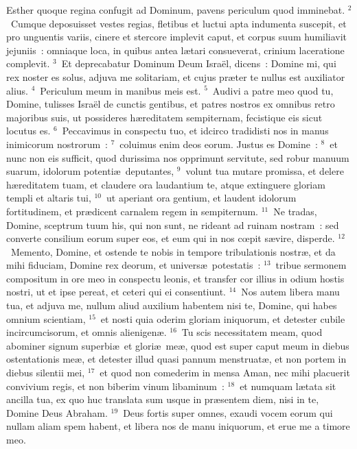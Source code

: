 \lettrine[lines=3,image=true,loversize=0.05,lraise=-0.03]{E}{}sther quoque regina confugit ad Dominum, pavens periculum quod imminebat.
${}^{2}$~Cumque deposuisset vestes regias, fletibus et luctui apta indumenta suscepit, et pro unguentis variis, cinere et stercore implevit caput, et corpus suum humiliavit jejuniis~: omniaque loca, in quibus antea l\ae tari consueverat, crinium laceratione complevit.
${}^{3}$~Et deprecabatur Dominum Deum Isra\"el, dicens~: Domine mi, qui rex noster es solus, adjuva me solitariam, et cujus pr\ae ter te nullus est auxiliator alius.
${}^{4}$~Periculum meum in manibus meis est.
${}^{5}$~Audivi a patre meo quod tu, Domine, tulisses Isra\"el de cunctis gentibus, et patres nostros ex omnibus retro majoribus suis, ut possideres h\ae reditatem sempiternam, fecistique eis sicut locutus es.
${}^{6}$~Peccavimus in conspectu tuo, et idcirco tradidisti nos in manus inimicorum nostrorum~:
${}^{7}$~coluimus enim deos eorum. Justus es Domine~:
${}^{8}$~et nunc non eis sufficit, quod durissima nos opprimunt servitute, sed robur manuum suarum, idolorum potenti\ae\ deputantes,
${}^{9}$~volunt tua mutare promissa, et delere h\ae reditatem tuam, et claudere ora laudantium te, atque extinguere gloriam templi et altaris tui,
${}^{10}$~ut aperiant ora gentium, et laudent idolorum fortitudinem, et pr\ae dicent carnalem regem in sempiternum.
${}^{11}$~Ne tradas, Domine, sceptrum tuum his, qui non sunt, ne rideant ad ruinam nostram~: sed converte consilium eorum super eos, et eum qui in nos cœpit s\ae vire, disperde.
${}^{12}$~Memento, Domine, et ostende te nobis in tempore tribulationis nostr\ae , et da mihi fiduciam, Domine rex deorum, et univers\ae\ potestatis~:
${}^{13}$~tribue sermonem compositum in ore meo in conspectu leonis, et transfer cor illius in odium hostis nostri, ut et ipse pereat, et ceteri qui ei consentiunt.
${}^{14}$~Nos autem libera manu tua, et adjuva me, nullum aliud auxilium habentem nisi te, Domine, qui habes omnium scientiam,
${}^{15}$~et nosti quia oderim gloriam iniquorum, et detester cubile incircumcisorum, et omnis alienigen\ae .
${}^{16}$~Tu scis necessitatem meam, quod abominer signum superbi\ae\ et glori\ae\ me\ae , quod est super caput meum in diebus ostentationis me\ae , et detester illud quasi pannum menstruat\ae , et non portem in diebus silentii mei,
${}^{17}$~et quod non comederim in mensa Aman, nec mihi placuerit convivium regis, et non biberim vinum libaminum~:
${}^{18}$~et numquam l\ae tata sit ancilla tua, ex quo huc translata sum usque in pr\ae sentem diem, nisi in te, Domine Deus Abraham.
${}^{19}$~Deus fortis super omnes, exaudi vocem eorum qui nullam aliam spem habent, et libera nos de manu iniquorum, et erue me a timore meo.

